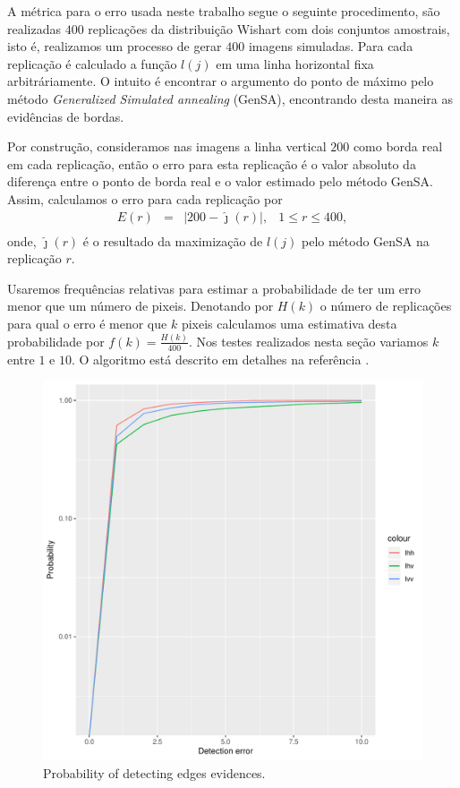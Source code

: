 \documentclass[conference]{IEEEtran}
\begin{document}
	A métrica para o erro usada neste trabalho segue o seguinte procedimento, são realizadas $400$ replicações da distribuição Wishart com dois conjuntos amostrais, isto é, realizamos um processo de gerar $400$ imagens simuladas. Para cada replicação é calculado a função $l(j)$ em uma linha horizontal fixa arbitráriamente. O intuito é encontrar o argumento do ponto de máximo pelo método {\it Generalized Simulated annealing} (GenSA), encontrando desta maneira as evidências de bordas.
	
	 Por construção, consideramos nas imagens a linha vertical $200$ como borda real em cada replicação, então o erro para esta replicação é o valor absoluto da diferença entre o ponto de borda real e o valor estimado pelo método GenSA. Assim, calculamos o erro para cada replicação por   
\begin{equation}\label{eq_12}
\begin{array}{llll}
	E(r) &=& |200 - \hat{\jmath}(r)|, & 1\leq r \leq 400,  \\
\end{array}
\end{equation}
onde, $\hat{\jmath}(r)$ é o resultado da maximização de $l(j)$ pelo método GenSA na replicação $r$.

Usaremos frequências relativas para estimar a probabilidade de ter um erro menor que um número de pixeis. Denotando por $H(k)$ o número de replicações para qual o erro é menor que $k$ pixeis calculamos uma estimativa desta probabilidade por $f(k)=\frac{H(k)}{400}$. Nos testes realizados nesta seção variamos $k$ entre $1$ e $10$. O algoritmo está descrito em detalhes na referência \cite{fbgm}. 


\begin{figure}[hbt]
	\centering
	\includegraphics[width=.7\linewidth]{metricas_ihh_ivh_ivv_nhfc_artigos}%
	\caption{Probability of detecting edges evidences.}
\label{probability_edge_detc}
\end{figure}
\end{document}
